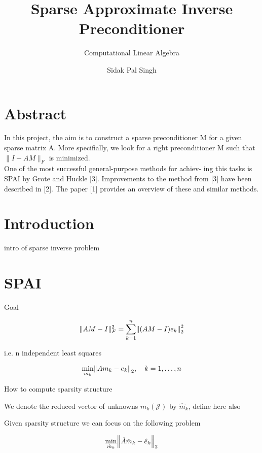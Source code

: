 \documentclass[paper=A4, fontsize=11pt]{scrartcl}
\title{Sparse Approximate Inverse Preconditioner}
\subtitle{Computational Linear Algebra}
\author{Sidak Pal Singh}
\let\originalleft\left
\let\originalright\right
\renewcommand{\left}{\mathopen{}\mathclose\bgroup\originalleft}
\renewcommand{\right}{\aftergroup\egroup\originalright}
\begin{document}
\maketitle

\section{Abstract}

In this project, the aim is to construct a sparse preconditioner M for a given sparse matrix A. More specifially, we look for a right preconditioner M such that $\|I-A M\|_{F}$ is minimized. \\
One of the most successful general-purpose methods for achiev- ing this tasks is SPAI by Grote and Huckle [3]. Improvements to the method from [3] have been described in [2]. The paper [1] provides an overview of these and similar methods.


\section{Introduction}

intro of sparse inverse problem

\newpage

\section{SPAI}

Goal

\begin{equation}
\|A M-I\|_{F}^{2}=\sum_{k=1}^{n}\left\|(A M-I) e_{k}\right\|_{2}^{2}
\end{equation}

i.e. n independent least squares


\begin{equation}
\min _{m_{k}}\left\|A m_{k}-e_{k}\right\|_{2}, \quad k=1, \ldots, n
\end{equation}


How to compute sparsity structure 



We denote the reduced vector of unknowns  $m_{k}(\mathcal{J}) $ by  $\hat{m}_{k}$, define here also %

Given sparsity structure we can focus on the following problem

\begin{equation}
\min _{\hat{m}_{k}}\left\|\hat{A} \hat{m}_{k}-\hat{e}_{k}\right\|_{2}
\end{equation}
\end{document}
